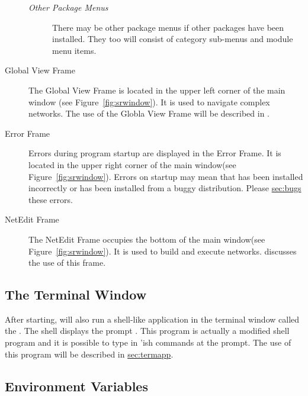 \begin{description}
  \begin{description}
  \item [\textit{Other Package Menus}] There may be other package
    menus if other packages have been installed.  They too will consist
    of category sub-menus and module menu items.
  \end{description}
  
\item[Global View Frame] The Global View Frame is located in the upper left
  corner of the main window (see Figure~\ref{fig:srwindow}). It is used to
  navigate complex networks.  The use of the Globla View Frame will be
  described in .
  
\item[Error Frame] Errors during program startup are displayed in the Error
  Frame.  It is located in the upper right corner of the main window(see
  Figure~\ref{fig:srwindow}).  Errors on startup may mean that \sr{} has
  been installed incorrectly or has been installed from a buggy
  distribution.  Please \hyperref{report}{(see Section~}{)}{sec:bugs} these
  errors.
  
\item[NetEdit Frame] The NetEdit Frame occupies the bottom of the main
  window(see Figure~\ref{fig:srwindow}).  It is used to build and execute
  networks.   discusses the use
  of this frame.

\end{description}

\subsection{The Terminal Window}
\label{sec:termwinapp}

After starting, \sr{} will also run a shell-like application in the
terminal window called the .  The \sr{} shell displays the
prompt .  This program is actually a modified  shell program and it is possible to type in
'ish \sr{} commands at the prompt. The use of this program
will be described in \hyperref{a later section}{Section~}{}{sec:termapp}.


\subsection{Environment Variables}
\label{sec:environ} 

